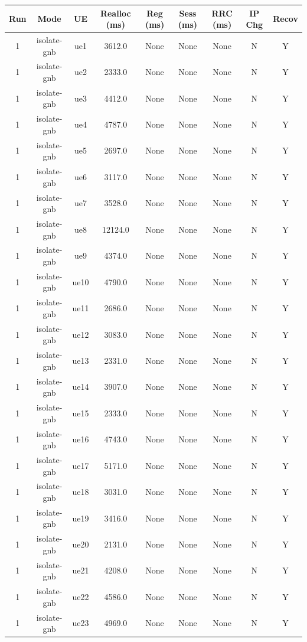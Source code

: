 \begin{table}[ht]
\centering
\begin{tabular}{|c|c|c|c|c|c|c|c|c|}
\hline
Run & Mode & UE & Realloc (ms) & Reg (ms) & Sess (ms) & RRC (ms) & IP Chg & Recov \\
\hline
1 & isolate-gnb & ue1 & 3612.0 & None & None & None & N & Y \\
1 & isolate-gnb & ue2 & 2333.0 & None & None & None & N & Y \\
1 & isolate-gnb & ue3 & 4412.0 & None & None & None & N & Y \\
1 & isolate-gnb & ue4 & 4787.0 & None & None & None & N & Y \\
1 & isolate-gnb & ue5 & 2697.0 & None & None & None & N & Y \\
1 & isolate-gnb & ue6 & 3117.0 & None & None & None & N & Y \\
1 & isolate-gnb & ue7 & 3528.0 & None & None & None & N & Y \\
1 & isolate-gnb & ue8 & 12124.0 & None & None & None & N & Y \\
1 & isolate-gnb & ue9 & 4374.0 & None & None & None & N & Y \\
1 & isolate-gnb & ue10 & 4790.0 & None & None & None & N & Y \\
1 & isolate-gnb & ue11 & 2686.0 & None & None & None & N & Y \\
1 & isolate-gnb & ue12 & 3083.0 & None & None & None & N & Y \\
1 & isolate-gnb & ue13 & 2331.0 & None & None & None & N & Y \\
1 & isolate-gnb & ue14 & 3907.0 & None & None & None & N & Y \\
1 & isolate-gnb & ue15 & 2333.0 & None & None & None & N & Y \\
1 & isolate-gnb & ue16 & 4743.0 & None & None & None & N & Y \\
1 & isolate-gnb & ue17 & 5171.0 & None & None & None & N & Y \\
1 & isolate-gnb & ue18 & 3031.0 & None & None & None & N & Y \\
1 & isolate-gnb & ue19 & 3416.0 & None & None & None & N & Y \\
1 & isolate-gnb & ue20 & 2131.0 & None & None & None & N & Y \\
1 & isolate-gnb & ue21 & 4208.0 & None & None & None & N & Y \\
1 & isolate-gnb & ue22 & 4586.0 & None & None & None & N & Y \\
1 & isolate-gnb & ue23 & 4969.0 & None & None & None & N & Y \\

\end{tabular}
\end{table}
